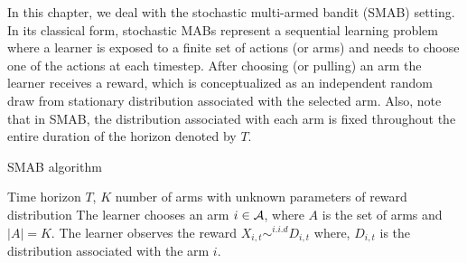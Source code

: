 In this chapter, we deal with the stochastic multi-armed bandit (SMAB) setting. In its classical form, stochastic MABs represent a sequential learning problem where a learner is exposed to a finite set of actions (or arms) and needs to choose one of the actions at each timestep. After choosing (or pulling) an arm the learner  receives a reward, which is conceptualized as an independent random draw from stationary distribution associated with the selected arm. Also, note that in SMAB, the distribution associated with each arm is fixed throughout the entire duration of the horizon denoted by $T$.

\begin{algorithm}[!th]
\caption{SMAB algorithm}
\label{alg:SMAB}
\begin{algorithmic}
 Time horizon $T$, $K$ number of arms with unknown parameters of reward distribution
\State {}
\State The learner chooses an arm $i\in\mathcal{A}$, where $A$ is the set of arms and $|A|=K$.
\State The learner observes the reward $X_{i,t}\sim^{i.i.d} D_{i,t}$ where, $D_{i,t}$ is the distribution associated with the arm $i$. 
\State \EndFor
\end{algorithmic}
\end{algorithm}
	 
